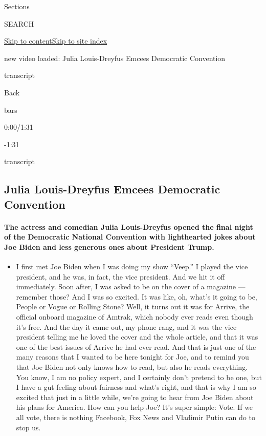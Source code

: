 Sections

SEARCH

\protect\hyperlink{site-content}{Skip to
content}\protect\hyperlink{site-index}{Skip to site index}

new video loaded: Julia Louis-Dreyfus Emcees Democratic Convention

transcript

Back

bars

0:00/1:31

-1:31

transcript

\hypertarget{julia-louis-dreyfus-emcees-democratic-convention}{%
\subsection{Julia Louis-Dreyfus Emcees Democratic
Convention}\label{julia-louis-dreyfus-emcees-democratic-convention}}

\hypertarget{the-actress-and-comedian-julia-louis-dreyfus-opened-the-final-night-of-the-democratic-national-convention-with-lighthearted-jokes-about-joe-biden-and-less-generous-ones-about-president-trump}{%
\paragraph{The actress and comedian Julia Louis-Dreyfus opened the final
night of the Democratic National Convention with lighthearted jokes
about Joe Biden and less generous ones about President
Trump.}\label{the-actress-and-comedian-julia-louis-dreyfus-opened-the-final-night-of-the-democratic-national-convention-with-lighthearted-jokes-about-joe-biden-and-less-generous-ones-about-president-trump}}

\begin{itemize}
\tightlist
\item
  I first met Joe Biden when I was doing my show ``Veep.'' I played the
  vice president, and he was, in fact, the vice president. And we hit it
  off immediately. Soon after, I was asked to be on the cover of a
  magazine --- remember those? And I was so excited. It was like, oh,
  what's it going to be, People or Vogue or Rolling Stone? Well, it
  turns out it was for Arrive, the official onboard magazine of Amtrak,
  which nobody ever reads even though it's free. And the day it came
  out, my phone rang, and it was the vice president telling me he loved
  the cover and the whole article, and that it was one of the best
  issues of Arrive he had ever read. And that is just one of the many
  reasons that I wanted to be here tonight for Joe, and to remind you
  that Joe Biden not only knows how to read, but also he reads
  everything. You know, I am no policy expert, and I certainly don't
  pretend to be one, but I have a gut feeling about fairness and what's
  right, and that is why I am so excited that just in a little while,
  we're going to hear from Joe Biden about his plans for America. How
  can you help Joe? It's super simple: Vote. If we all vote, there is
  nothing Facebook, Fox News and Vladimir Putin can do to stop us.
\end{itemize}

